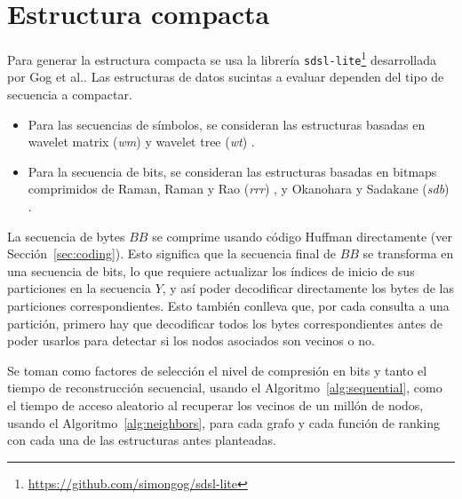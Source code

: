 %


\section{Estructura compacta}

Para generar la estructura compacta se usa la librería \texttt{sdsl-lite}\footnote{\url{https://github.com/simongog/sdsl-lite}} desarrollada por Gog et al.\cite{gbmp2014sea}. Las estructuras de datos sucintas a evaluar dependen del tipo de secuencia a compactar.

\begin{itemize}
	\item Para las secuencias de símbolos, se consideran las estructuras basadas en wavelet matrix (\textit{wm}) \cite{claude2015wavelet} y wavelet tree (\textit{wt}) \cite{grossi2003high}.
	\item Para la secuencia de bits, se consideran las estructuras basadas en bitmaps comprimidos de Raman, Raman y Rao (\textit{rrr}) \cite{raman2002succinct}, y Okanohara y Sadakane (\textit{sdb}) \cite{DBLP:journals/corr/abs-cs-0610001}.
\end{itemize}

La secuencia de bytes $BB$ se comprime usando código Huffman\cite{huffman1952method} directamente (ver Sección~\ref{sec:coding}). Esto significa que la secuencia final de $BB$ se transforma en una secuencia de bits, lo que requiere actualizar los índices de inicio de sus particiones en la secuencia $Y$, y así poder decodificar directamente los bytes de las particiones correspondientes. Esto también conlleva que, por cada consulta a una partición, primero hay que decodificar todos los bytes correspondientes antes de poder usarlos para detectar si los nodos asociados son vecinos o no.

Se toman como factores de selección el nivel de compresión en bits y tanto el tiempo de reconstrucción secuencial, usando el Algoritmo~\ref{alg:sequential}, como el tiempo de acceso aleatorio al recuperar los vecinos de un millón de nodos, usando el Algoritmo~\ref{alg:neighbors}, para cada grafo y cada función de ranking con cada una de las estructuras antes planteadas.

%
%
%
%

